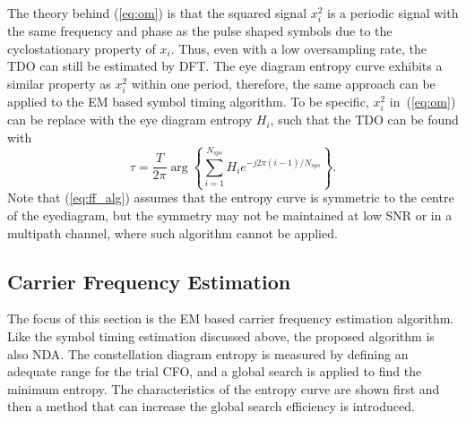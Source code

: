 \documentclass[journal,comsoc]{IEEEtran}
\begin{document}
The theory behind (\ref{eq:om}) is that the squared signal \(x_i^2\) is a periodic signal with the same frequency and phase as the pulse shaped symbols due to the cyclostationary property of \(x_i\).
Thus, even with a low oversampling rate, the TDO can still be estimated by DFT.
The eye diagram entropy curve exhibits a similar property as \(x_i^2\) within one period,
therefore, the same approach can be applied to the EM based symbol timing algorithm.
% 
% 
To be specific, \(x_i^2\) in~(\ref{eq:om}) can be replace  with the eye diagram entropy \(H_i\), 
such that the TDO can be found with
\begin{equation}
\tau  = \frac{T}{{2\pi }}\arg \left\{ {\sum\limits_{i = 1}^{N_{sps}} {H_i{e^{ - j2\pi (i-1)/N_{sps}}}} } \right\}.
\label{eq:ff_alg}
\end{equation}
Note that (\ref{eq:ff_alg}) assumes that the entropy curve is symmetric to the centre of the eyediagram,
but the symmetry may not be maintained at low SNR or in a multipath channel, where such algorithm cannot be applied.

\subsection{Carrier Frequency Estimation}
\label{sec:carrier_recovery}
The focus of this section is the EM based carrier frequency estimation algorithm.
Like the symbol timing estimation discussed above, the proposed algorithm is also NDA.
The constellation diagram entropy is measured by defining an adequate range for the trial CFO, and a global search is applied to find the minimum entropy. 
The characteristics of the entropy curve are shown first and then a method that can increase the global search efficiency is introduced. 
\end{document}
